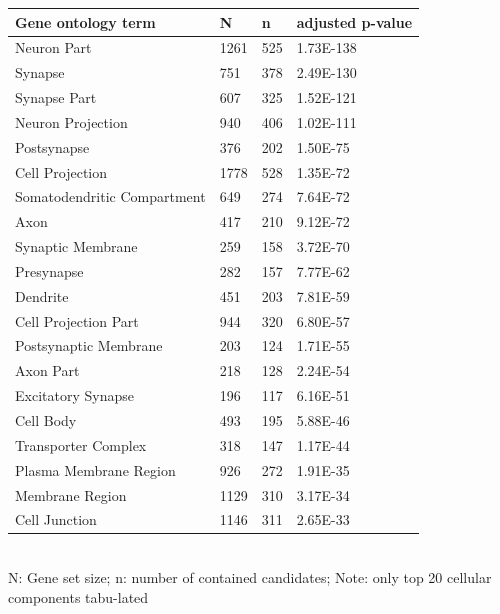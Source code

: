 \begin{refsection}
\begin{table}[H]
\small
{}\selectfont
{} \label{table3S9} 
\centering
\begin{tabular}{@{}llll@{}}
\hline
Gene ontology term          & N    & n   & adjusted p-value \\ \hline
Neuron Part                 & 1261 & 525 & 1.73E-138        \\
Synapse                     & 751  & 378 & 2.49E-130        \\
Synapse Part                & 607  & 325 & 1.52E-121        \\
Neuron Projection           & 940  & 406 & 1.02E-111        \\
Postsynapse                 & 376  & 202 & 1.50E-75         \\
Cell Projection             & 1778 & 528 & 1.35E-72         \\
Somatodendritic Compartment & 649  & 274 & 7.64E-72         \\
Axon                        & 417  & 210 & 9.12E-72         \\
Synaptic Membrane           & 259  & 158 & 3.72E-70         \\
Presynapse                  & 282  & 157 & 7.77E-62         \\
Dendrite                    & 451  & 203 & 7.81E-59         \\
Cell Projection Part        & 944  & 320 & 6.80E-57         \\
Postsynaptic Membrane       & 203  & 124 & 1.71E-55         \\
Axon Part                   & 218  & 128 & 2.24E-54         \\
Excitatory Synapse          & 196  & 117 & 6.16E-51         \\
Cell Body                   & 493  & 195 & 5.88E-46         \\
Transporter Complex         & 318  & 147 & 1.17E-44         \\
Plasma Membrane Region      & 926  & 272 & 1.91E-35         \\
Membrane Region             & 1129 & 310 & 3.17E-34         \\
Cell Junction               & 1146 & 311 & 2.65E-33         \\ \hline
\end{tabular}\\
N: Gene set size; n: number of contained candidates; Note: only top 20 cellular components tabu-lated
\end{table}



\end{refsection}
